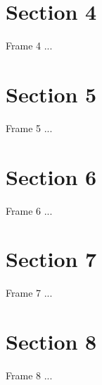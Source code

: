 \documentclass[compress]{beamer}
\let\oldsection\section
\renewcommand{\section}[1]{\oldsection{#1}\label{sec:\thesection}}
\begin{document}
\section{Section 4}
\begin{frame}{Frame 4}
...
\end{frame}

\section{Section 5}
\begin{frame}{Frame 5}
...
\end{frame}

\section{Section 6}
\begin{frame}{Frame 6}
...
\end{frame}

\section{Section 7}
\begin{frame}{Frame 7}
...
\end{frame}

\section{Section 8}
\begin{frame}{Frame 8}
...
\end{frame}

\end{document}
